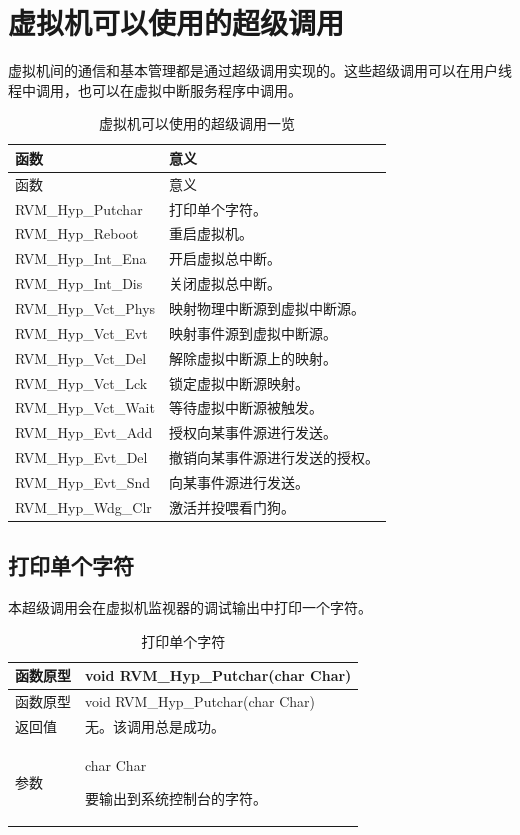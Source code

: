 \section{虚拟机可以使用的超级调用}\label{sec:4-4}

虚拟机间的通信和基本管理都是通过超级调用实现的。这些超级调用可以在用户线程中调用，也可以在虚拟中断服务程序中调用。

\begin{xltabular}{\textwidth}{@{}>{\hsize\raggedright\arraybackslash}X>{\hsize\raggedright\arraybackslash}X@{}}
\caption{虚拟机可以使用的超级调用一览}\label{tab:4-4}\\
\toprule
函数 & 意义\tabularnewline
\endfirsthead
\toprule
函数 & 意义\tabularnewline
\midrule
\endhead
\bottomrule
\endlastfoot
RVM\_\allowbreak{}Hyp\_\allowbreak{}Putchar & 打印单个字符。\tabularnewline
RVM\_\allowbreak{}Hyp\_\allowbreak{}Reboot & 重启虚拟机。\tabularnewline
RVM\_\allowbreak{}Hyp\_\allowbreak{}Int\_\allowbreak{}Ena & 开启虚拟总中断。\tabularnewline
RVM\_\allowbreak{}Hyp\_\allowbreak{}Int\_\allowbreak{}Dis & 关闭虚拟总中断。\tabularnewline
RVM\_\allowbreak{}Hyp\_\allowbreak{}Vct\_\allowbreak{}Phys & 映射物理中断源到虚拟中断源。\tabularnewline
RVM\_\allowbreak{}Hyp\_\allowbreak{}Vct\_\allowbreak{}Evt & 映射事件源到虚拟中断源。\tabularnewline
RVM\_\allowbreak{}Hyp\_\allowbreak{}Vct\_\allowbreak{}Del & 解除虚拟中断源上的映射。\tabularnewline
RVM\_\allowbreak{}Hyp\_\allowbreak{}Vct\_\allowbreak{}Lck & 锁定虚拟中断源映射。\tabularnewline
RVM\_\allowbreak{}Hyp\_\allowbreak{}Vct\_\allowbreak{}Wait & 等待虚拟中断源被触发。\tabularnewline
RVM\_\allowbreak{}Hyp\_\allowbreak{}Evt\_\allowbreak{}Add & 授权向某事件源进行发送。\tabularnewline
RVM\_\allowbreak{}Hyp\_\allowbreak{}Evt\_\allowbreak{}Del & 撤销向某事件源进行发送的授权。\tabularnewline
RVM\_\allowbreak{}Hyp\_\allowbreak{}Evt\_\allowbreak{}Snd & 向某事件源进行发送。\tabularnewline
RVM\_\allowbreak{}Hyp\_\allowbreak{}Wdg\_\allowbreak{}Clr & 激活并投喂看门狗。\tabularnewline
\end{xltabular}

\subsection{打印单个字符}\label{subsec:4-4-1}

本超级调用会在虚拟机监视器的调试输出中打印一个字符。

\begin{xltabular}{\textwidth}{@{}>{\hsize\raggedright\arraybackslash}X>{\hsize\raggedright\arraybackslash}X@{}}
\caption{打印单个字符}\label{tab:4-5}\\
\toprule
函数原型 & void RVM\_\allowbreak{}Hyp\_\allowbreak{}Putchar(char Char)\tabularnewline
\endfirsthead
\toprule
函数原型 & void RVM\_\allowbreak{}Hyp\_\allowbreak{}Putchar(char Char)\tabularnewline
\midrule
\endhead
\bottomrule
\endlastfoot
返回值 & 无。该调用总是成功。\tabularnewline
参数\strut
 & char Char

要输出到系统控制台的字符。\strut
\tabularnewline
\end{xltabular}

